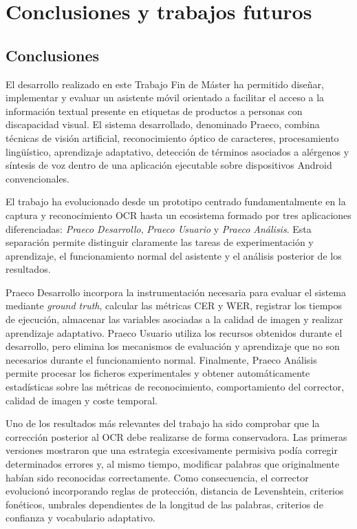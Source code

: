 \chapter{Conclusiones y trabajos futuros}

\section{Conclusiones}

El desarrollo realizado en este Trabajo Fin de Máster ha permitido diseñar, implementar y evaluar un asistente móvil orientado a facilitar el acceso a la información textual presente en etiquetas de productos a personas con discapacidad visual. El sistema desarrollado, denominado Praeco, combina técnicas de visión artificial, reconocimiento óptico de caracteres, procesamiento lingüístico, aprendizaje adaptativo, detección de términos asociados a alérgenos y síntesis de voz dentro de una aplicación ejecutable sobre dispositivos Android convencionales.

El trabajo ha evolucionado desde un prototipo centrado fundamentalmente en la captura y reconocimiento OCR hasta un ecosistema formado por tres aplicaciones diferenciadas: \textit{Praeco Desarrollo}, \textit{Praeco Usuario} y \textit{Praeco Análisis}. Esta separación permite distinguir claramente las tareas de experimentación y aprendizaje, el funcionamiento normal del asistente y el análisis posterior de los resultados.

Praeco Desarrollo incorpora la instrumentación necesaria para evaluar el sistema mediante \textit{ground truth}, calcular las métricas CER y WER, registrar los tiempos de ejecución, almacenar las variables asociadas a la calidad de imagen y realizar aprendizaje adaptativo. Praeco Usuario utiliza los recursos obtenidos durante el desarrollo, pero elimina los mecanismos de evaluación y aprendizaje que no son necesarios durante el funcionamiento normal. Finalmente, Praeco Análisis permite procesar los ficheros experimentales y obtener automáticamente estadísticas sobre las métricas de reconocimiento, comportamiento del corrector, calidad de imagen y coste temporal.

Uno de los resultados más relevantes del trabajo ha sido comprobar que la corrección posterior al OCR debe realizarse de forma conservadora. Las primeras versiones mostraron que una estrategia excesivamente permisiva podía corregir determinados errores y, al mismo tiempo, modificar palabras que originalmente habían sido reconocidas correctamente. Como consecuencia, el corrector evolucionó incorporando reglas de protección, distancia de Levenshtein, criterios fonéticos, umbrales dependientes de la longitud de las palabras, criterios de confianza y vocabulario adaptativo.

